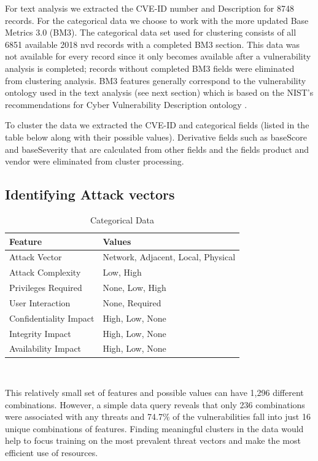 \documentclass{article} %
\begin{document}
For text analysis we extracted the CVE-ID number and Description for 8748 records.  For the categorical data we choose to work with the more updated Base Metrics 3.0 (BM3). The categorical data set used for clustering consists of all 6851 available 2018 nvd records with a completed BM3 section.  This data was not available for every record since it only becomes available after a vulnerability analysis is completed; records without completed BM3 fields were eliminated from clustering analysis.  BM3 features generally correspond to the vulnerability ontology used in the text analysis (see next section) which is based on the NIST's recommendations for Cyber Vulnerability Description ontology \cite{Booth2016DraftOntology}.

To cluster the data we extracted the CVE-ID and categorical fields (listed in the table below along with their possible values).  Derivative fields such as baseScore and baseSeverity that are calculated from other fields and the fields product and vendor were eliminated from cluster processing.    


\subsection{Identifying Attack vectors}
\begin{table}[h!]
\begin{center}
\begin{tabular}{ |l|l| } \hline
Feature & Values\\\hline
Attack Vector & Network, Adjacent, Local, Physical  \\ 
Attack Complexity & Low, High  \\ 
Privileges Required & None, Low, High  \\ 
User Interaction & None, Required  \\ 
Confidentiality Impact & High, Low, None\\
Integrity Impact & High, Low, None\\
Availability Impact & High, Low, None\\
\hline
\end{tabular}
\end{center}
\caption{Categorical Data} \\
\label{table:1}
\end{table}

This relatively small set of features and possible values can have 1,296 different combinations.  However, a simple data query reveals that only 236 combinations were associated with any threats and 74.7\% of the vulnerabilities fall into just 16 unique combinations of features.  Finding meaningful clusters in the data would help to focus training on the most prevalent threat vectors and make the most efficient use of resources.  
\end{document}
